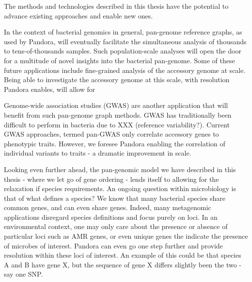 


\noindent
The methods and technologies described in this thesis have the potential to advance existing approaches and enable new ones. 

In the context of bacterial genomics in general, pan-genome reference graphs, as used by Pandora, will eventually facilitate the simultaneous analysis of thousands to tens-of-thousands samples. Such population-scale analyses will open the door for a multitude of novel insights into the bacterial pan-genome. Some of these future applications include fine-grained analysis of the accessory genome at scale. Being able to investigate the accessory genome at this scale, with resolution Pandora enables, will allow for 


Genome-wide association studies (GWAS) are another application that will benefit from such pan-genome graph methods. GWAS has traditionally been difficult to perform in bacteria due to XXX (reference variability?). Current GWAS approaches, termed pan-GWAS only correlate accessory genes to phenotypic traits. However, we foresee Pandora enabling the correlation of individual variants to traits - a dramatic improvement in scale. 


Looking even further ahead, the pan-genomic model we have described in this thesis - where we let go of gene ordering - lends itself to allowing for the relaxation if species requirements. An ongoing question within microbiology is that of what defines a species? We know that many bacterial species share common genes, and can even share genes. Indeed, many metagenomic applications disregard species definitions and focus purely on loci. In an environmental context, one may only care about the presence or absence of particular loci such as AMR genes, or even unique genes the indicate the presence of microbes of interest. Pandora can even go one step further and provide resolution within these loci of interest. An example of this could be that species A and B have gene X, but the sequence of gene X differs slightly been the two - say one SNP. 

